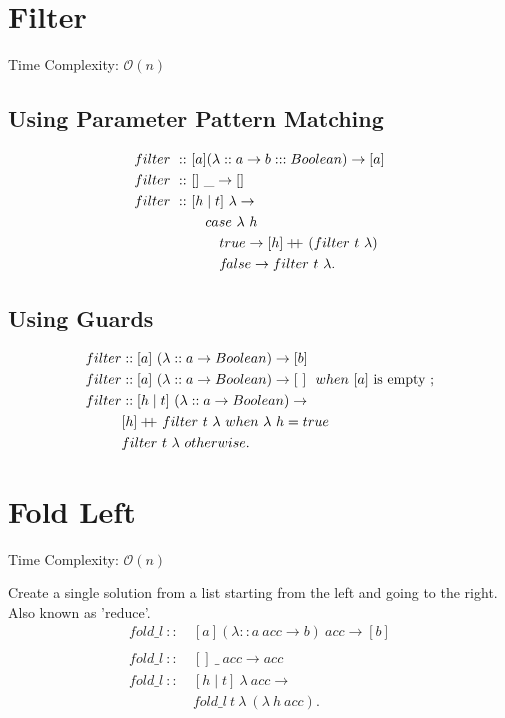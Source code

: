 \documentclass[a4paper,10pt]{book}
\newcommand\doubleplus{+\kern-1.3ex+\kern0.8ex}
\newcommand{\false}{f\kern-0.25ex{alse}}
\newcommand\f{\textit{f}}
\begin{document}
\section{Filter}
Time Complexity: $\mathcal{O}(n)$

\subsection{Using Parameter Pattern Matching}

\begin{align*}
filter\ ::\ &[a](\lambda::a\rightarrow b:::Boolean)\rightarrow[a]\\
filter\ ::\ &[]\ \_\rightarrow []\\
filter\ ::\ &[h\mid t]\  \lambda\rightarrow\\
&\quad case\ \lambda\ h\\
&\quad\quad true\rightarrow [h]\doubleplus(filter\ t\ \lambda)\\
&\quad\quad\false\rightarrow filter\ t\ \lambda.
\end{align*}

\subsection{Using Guards}
\begin{align*}
  filter &:: [a]\ (\lambda :: a\rightarrow Boolean)\rightarrow[b]\\
  filter &:: [a]\ (\lambda :: a\rightarrow Boolean)\rightarrow [\ ]\ \ when\ [a]\text{ is empty };\\
  filter &:: [h\mid t]\ (\lambda :: a\rightarrow Boolean)\rightarrow\\
  &[h]\doubleplus filter\ t\ \lambda\ 
  when\ \lambda\ h = true\\
  &filter\ t\ \lambda\ 
  otherwise.
  \end{align*}
  
 \section{Fold Left} 
Time Complexity: $\mathcal{O}(n)$

Create a single solution from a list starting from the left and going to the right. Also known as 'reduce'.
\begin{align*}
\f old\_l\ ::\ &[a](\lambda::a\ acc\rightarrow b)\ acc\rightarrow[b]\\
\\
\f old\_l\ ::\ &[]\ \_\ acc\rightarrow acc\\
\f old\_l\ ::\ &[h\mid t]\  \lambda\ acc\rightarrow\\
&\f old\_l\ t\ \lambda\ (\lambda\ h\ acc).
\end{align*}
\end{document}
